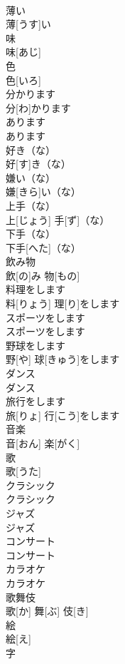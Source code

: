 \documentclass[8pt]{extreport}
\begin{document}
\begin{CJK}{UTF8}{min}
\\	薄い	
\\	薄[うす]い		
\\	味	
\\	味[あじ]		
\\	色	
\\	色[いろ]		
\\	分かります	
\\	分[わ]かります		
\\	あります	
\\	あります		
\\	好き（な）	
\\	好[す]き（な）		
\\	嫌い（な）	
\\	嫌[きら]い（な）		
\\	上手（な）	
\\	上[じょう] 手[ず]（な）		
\\	下手（な）	
\\	下手[へた]（な）		
\\	飲み物	
\\	飲[の]み 物[もの]		
\\	料理をします	
\\	料[りょう] 理[り]をします		
\\	スポーツをします	
\\	スポーツをします		
\\	野球をします	
\\	野[や] 球[きゅう]をします		
\\	ダンス	
\\	ダンス		
\\	旅行をします	
\\	旅[りょ] 行[こう]をします		
\\	音楽	
\\	音[おん] 楽[がく]		
\\	歌	
\\	歌[うた]		
\\	クラシック	
\\	クラシック		
\\	ジャズ	
\\	ジャズ		
\\	コンサート	
\\	コンサート		
\\	カラオケ	
\\	カラオケ		
\\	歌舞伎	
\\	歌[か] 舞[ぶ] 伎[き]		
\\	絵	
\\	絵[え]		
\\	字	

\end{CJK}
\end{document}
